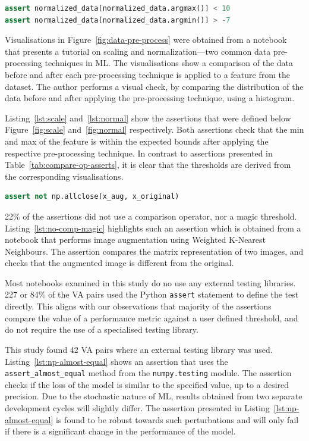 \documentclass[conference]{IEEEtran}
\begin{document}
\begin{lstlisting}[language=Python, caption={Similar premise as Listing~\ref{lst:scale}, however this assertion is based on Figure~\ref{fig:normal}.}, label={lst:normal}]
assert normalized_data[normalized_data.argmax()] < 10
assert normalized_data[normalized_data.argmin()] > -7
\end{lstlisting}

Visualisations in Figure~\ref{fig:data-pre-process} were obtained from a notebook that presents a tutorial on scaling and normalization---two common data pre-processing techniques in ML. The visualisations show a comparison of the data before and after each pre-processing technique is applied to a feature from the dataset. The author performs a visual check, by comparing the distribution of the data before and after applying the pre-processing technique, using a histogram.

Listing~\ref{lst:scale} and~\ref{lst:normal} show the assertions that were defined below Figure~\ref{fig:scale} and~\ref{fig:normal} respectively. Both assertions check that the min and max of the feature is within the expected bounds after applying the respective pre-processing technique. In contrast to assertions presented in Table~\ref{tab:compare-op-asserts}, it is clear that the thresholds are derived from the corresponding visualisations.

\begin{lstlisting}[language=Python, caption={Assertion to check that an augmented image is different from the original.}, label={lst:no-comp-magic}]
assert not np.allclose(x_aug, x_original)
\end{lstlisting}

22\% of the assertions did not use a comparison operator, nor a magic threshold. Listing~\ref{lst:no-comp-magic} highlights such an assertion which is obtained from a notebook that performs image augmentation using Weighted K-Nearest Neighbours. The assertion compares the matrix representation of two images, and checks that the augmented image is different from the original.

Most notebooks examined in this study do no use any external testing libraries. 227 or 84\% of the VA pairs used the Python \texttt{assert} statement to define the test directly. This aligns with our observations that majority of the assertions compare the value of a performance metric against a user defined threshold, and do not require the use of a specialised testing library. 

This study found 42 VA pairs where an external testing library was used. Listing~\ref{lst:np-almost-equal} shows an assertion that uses the \texttt{assert\_almost\_equal} method from the \texttt{numpy.testing} module. The assertion checks if the loss of the model is similar to the specified value, up to a desired precision. Due to the stochastic nature of ML, results obtained from two separate development cycles will slightly differ. The assertion presented in Listing~\ref{lst:np-almost-equal} is found to be robust towards such perturbations and will only fail if there is a significant change in the performance of the model.
\end{document}
